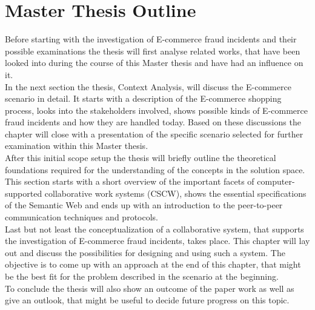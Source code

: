 
\section{Master Thesis Outline}
\label{sec:thesis_outline}

Before starting with the investigation of E-commerce fraud incidents and their possible examinations the thesis will first analyse related works, that have been looked into during the course of this Master thesis and have had an influence on it. \\

In the next section the thesis, Context Analysis, will discuss the E-commerce scenario in detail. It starts with a description of the E-commerce shopping process, looks into the stakeholders involved, shows possible kinds of E-commerce fraud incidents and how they are handled today. Based on these discussions the chapter will close with a presentation of the specific scenario selected for further examination within this Master thesis. \\

After this initial scope setup the thesis will briefly outline the theoretical foundations required for the understanding of the concepts in the solution space. This section starts with a short overview of the important facets of computer-supported collaborative work systems (\gls{CSCW}), shows the essential  specifications of the Semantic Web and ends up with an introduction to the peer-to-peer communication techniques and protocols. \\

Last but not least the conceptualization of a collaborative system, that supports the investigation of E-commerce fraud incidents, takes place. This chapter will lay out and discuss the possibilities for designing and using such a system. The objective is to come up with an approach at the end of this chapter, that might be the best fit for the problem described in the scenario at the beginning. \\

To conclude the thesis will also show an outcome of the paper work as well as give an outlook, that might be useful to decide future progress on this topic.

